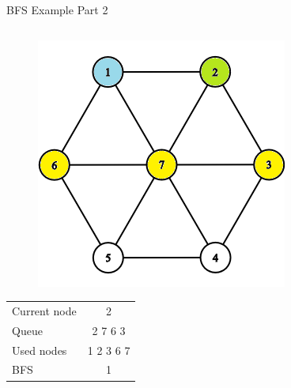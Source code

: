 \documentclass[aspectratio=169]{beamer}%
\begin{document}
\begin{frame}{BFS Example Part 2}
\begin{columns}
\begin{column}{0.32\textwidth}
\begin{figure}[!ht]
                \centering
                \includegraphics[width=0.9\linewidth]{bfs 6.png}
            \end{figure}
            \begin{table}[ht]
                \centering
                \begin{tabular}{l c}
                    Current node & 2\\
                    Queue & 2 7 6 3\\ 
                    Used nodes & 1 2 3 6 7\\
                    BFS & 1
                \end{tabular}
            \end{table}
        \end{column}
    \end{columns}
\end{frame}
\end{document}
